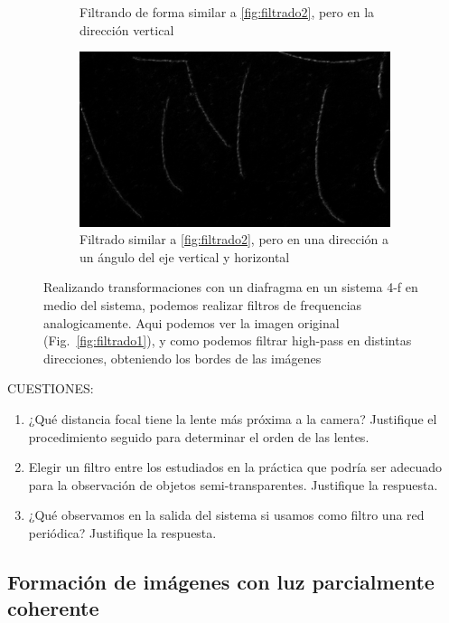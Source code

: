 \documentclass{./packages/optica-article}
\begin{document}
\begin{figure}[hptb]
\begin{center}
\begin{subfigure}[t]{0.45\textwidth}
    \caption{Filtrando de forma similar a \ref{fig:filtrado2}, pero en la dirección vertical}
   \label{fig:filtrado3}
	\end{subfigure}
	\quad
	\begin{subfigure}[t]{0.45\textwidth}\centering
		\includegraphics[width=\textwidth]{parte4-filtrado/4f-pic-2ocm-diafragm-10cm-camera-letters-high-frequency-dot-right-a-bit-down.png}
  \caption{Filtrado similar a \ref{fig:filtrado2}, pero en una dirección a un ángulo del eje vertical y horizontal}
 	\end{subfigure}
	\caption{Realizando transformaciones con un diafragma en un sistema 4-f en medio del sistema, podemos realizar filtros de frequencias analogicamente. Aqui podemos ver la imagen original (Fig.~\ref{fig:filtrado1}), y como podemos filtrar high-pass en distintas direcciones, obteniendo los bordes de las imágenes}
	\label{fig:filtrado4}
\end{center}
\end{figure}

CUESTIONES:
\begin{enumerate}
\item ¿Qué distancia focal tiene la lente más próxima a la camera? Justifique el procedimiento seguido para determinar el orden de las lentes.
\item Elegir un filtro entre los estudiados en la práctica que podría ser adecuado para la observación de objetos semi-transparentes. Justifique la respuesta.
\item ¿Qué observamos en la salida del sistema si usamos como filtro una red periódica? Justifique la respuesta.
\end{enumerate}


\subsection{Formación de imágenes con luz parcialmente coherente}
\end{document}
